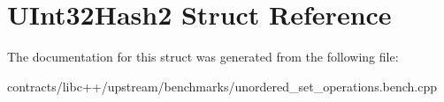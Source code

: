\hypertarget{struct_u_int32_hash2}{}\section{U\+Int32\+Hash2 Struct Reference}
\label{struct_u_int32_hash2}


The documentation for this struct was generated from the following file\+:\begin{DoxyCompactItemize}
\item 
contracts/libc++/upstream/benchmarks/unordered\+\_\+set\+\_\+operations.\+bench.\+cpp\end{DoxyCompactItemize}
